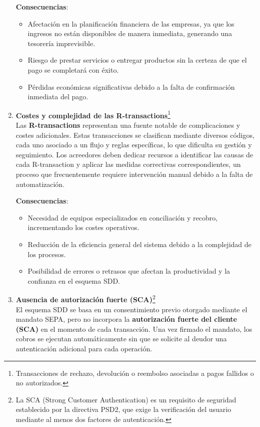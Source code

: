 \begin{enumerate}[label=\textbf{\arabic*.}, leftmargin=0.75cm]
        \textbf{Consecuencias}:
        \begin{itemize}
          \item Afectación en la planificación financiera de las empresas, ya que los ingresos no están disponibles de manera inmediata, generando una tesorería imprevisible.
          \item Riesgo de prestar servicios o entregar productos sin la certeza de que el pago se completará con éxito.
          \item Pérdidas económicas significativas debido a la falta de confirmación inmediata del pago.
        \end{itemize}

  \item \textbf{Costes y complejidad de las R-transactions}\footnote{Transacciones de rechazo, devolución o reembolso asociadas a pagos fallidos o no autorizados.}\\
        Las \textbf{R-transactions} representan una fuente notable de complicaciones y costes adicionales. Estas transacciones se clasifican mediante diversos códigos, cada uno asociado a un flujo y reglas específicas, lo que dificulta su gestión y seguimiento. Los acreedores deben dedicar recursos a identificar las causas de cada R-transaction y aplicar las medidas correctivas correspondientes, un proceso que frecuentemente requiere intervención manual debido a la falta de automatización.
        
        \textbf{Consecuencias}:
        \begin{itemize}
          \item Necesidad de equipos especializados en conciliación y recobro, incrementando los costes operativos.
          \item Reducción de la eficiencia general del sistema debido a la complejidad de los procesos.
          \item Posibilidad de errores o retrasos que afectan la productividad y la confianza en el esquema SDD.
        \end{itemize}

  \item \textbf{Ausencia de autorización fuerte (\textsc{SCA})}\footnote{La SCA (Strong Customer Authentication) es un requisito de seguridad establecido por la directiva PSD2, que exige la verificación del usuario mediante al menos dos factores de autenticación.}\\
        El esquema SDD se basa en un consentimiento previo otorgado mediante el mandato SEPA, pero no incorpora la \textbf{autorización fuerte del cliente (SCA)} en el momento de cada transacción. Una vez firmado el mandato, los cobros se ejecutan automáticamente sin que se solicite al deudor una autenticación adicional para cada operación.
        

\end{enumerate}
